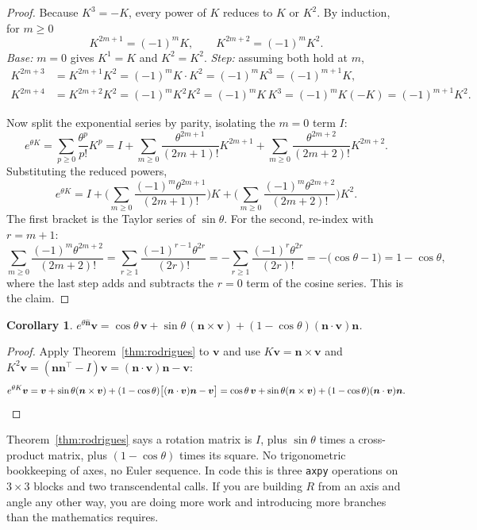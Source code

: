 \documentclass[11pt]{article}
\newcommand{\vv}[1]{\bm{#1}}
\newcommand{\hatmap}[1]{\widehat{#1}}
\theoremstyle{plain}
\newtheorem{corollary}[theorem]{Corollary}
\theoremstyle{definition}
\begin{document}
\begin{proof}
Because $K^3=-K$, every power of $K$ reduces to $K$ or $K^2$. By induction, for $m\ge0$
\[
K^{2m+1}=(-1)^{m}K ,\qquad K^{2m+2}=(-1)^{m}K^{2}.
\]
\emph{Base:} $m=0$ gives $K^1=K$ and $K^2=K^2$. \emph{Step:} assuming both hold at $m$,
\begin{align*}
K^{2m+3}&=K^{2m+1}K^2=(-1)^mK\cdot K^2=(-1)^mK^3=(-1)^{m+1}K,\\
K^{2m+4}&=K^{2m+2}K^{2}=(-1)^mK^2K^2=(-1)^mK\,K^3=(-1)^{m}K(-K)=(-1)^{m+1}K^2 .
\end{align*}

Now split the exponential series by parity, isolating the $m=0$ term $I$:
\[
e^{\theta K}=\sum_{p\ge0}\frac{\theta^p}{p!}K^p
= I+\sum_{m\ge0}\frac{\theta^{2m+1}}{(2m+1)!}K^{2m+1}
+\sum_{m\ge0}\frac{\theta^{2m+2}}{(2m+2)!}K^{2m+2}.
\]
Substituting the reduced powers,
\[
e^{\theta K}=I+\Big(\sum_{m\ge0}\frac{(-1)^m\theta^{2m+1}}{(2m+1)!}\Big)K
+\Big(\sum_{m\ge0}\frac{(-1)^m\theta^{2m+2}}{(2m+2)!}\Big)K^2 .
\]
The first bracket is the Taylor series of $\sin\theta$. For the second, re-index with $r=m+1$:
\[
\sum_{m\ge0}\frac{(-1)^m\theta^{2m+2}}{(2m+2)!}
=\sum_{r\ge1}\frac{(-1)^{r-1}\theta^{2r}}{(2r)!}
=-\sum_{r\ge1}\frac{(-1)^{r}\theta^{2r}}{(2r)!}
=-\Big(\cos\theta-1\Big)=1-\cos\theta ,
\]
where the last step adds and subtracts the $r=0$ term of the cosine series. This is the claim.
\end{proof}

\begin{corollary}\label{cor:rodvec}
$e^{\theta\hatmap{\vv n}}\vv v=\cos\theta\,\vv v+\sin\theta\,(\vv n\times\vv v)
+(1-\cos\theta)(\vv n\cdot\vv v)\vv n$.
\end{corollary}

\begin{proof}
Apply Theorem~\ref{thm:rodrigues} to $\vv v$ and use $K\vv v=\vv n\times\vv v$ and
$K^2\vv v=(\vv n\vv n^{\!\top}-I)\vv v=(\vv n\cdot\vv v)\vv n-\vv v$:
\[
e^{\theta K}\vv v=\vv v+\sin\theta(\vv n\times\vv v)+(1-\cos\theta)\big[(\vv n\cdot\vv v)\vv n-\vv v\big]
=\cos\theta\,\vv v+\sin\theta(\vv n\times\vv v)+(1-\cos\theta)(\vv n\cdot\vv v)\vv n . \qedhere
\]
\end{proof}

\begin{practical}
Theorem~\ref{thm:rodrigues} says a rotation matrix is $I$, plus $\sin\theta$ times a cross-product
matrix, plus $(1-\cos\theta)$ times its square. No trigonometric bookkeeping of axes, no Euler
sequence. In code this is three \texttt{axpy} operations on $3\times3$ blocks and two transcendental
calls. If you are building $R$ from an axis and angle any other way, you are doing more work and
introducing more branches than the mathematics requires.
\end{practical}
\end{document}
